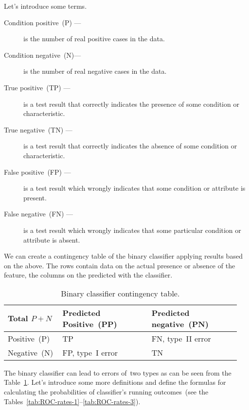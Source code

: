 \documentclass[]{scrreprt}
\begin{document}
Let's introduce some terms.
\begin{description}
	\item[Condition positive~(P) --- ] is the number of real positive cases in the data.
	\item[Condition negative~(N)---] is the number of real negative cases in the data.
	\item[True positive~(TP) ---] is a test result that correctly indicates the presence of some condition or characteristic.
	\item[True negative~(TN) ---] is a test result that correctly indicates the absence of some condition or characteristic.
	\item[False positive~(FP) ---] is a test result which wrongly indicates that some condition or attribute is present.
	\item[False negative~(FN) ---] is a test result which wrongly indicates that some particular condition or attribute is absent.
\end{description}
We can create a contingency table of the binary classifier applying results based on the above. The rows contain data on the actual presence or absence of the feature, the columns on the predicted with the classifier.
%
\begin{table}[htp]
	\caption{Binary classifier contingency table.}  \label{tab:ROC-contingency-table}
	\centering
	\begin{tabularx}{\textwidth}{p{0.2\linewidth} p{0.375\linewidth} p{0.375\linewidth}} 
		\hline
	Total $P+N$&Predicted Positive~(PP)&Predicted negative~(PN)\\
		\hline
		Positive~(P)&TP&FN, type~II error~\cite{Wiki:type-1-2-errors}\\
		\hline
		Negative~(N)&FP, type~I error~\cite{Wiki:type-1-2-errors}&TN\\
		\hline
	\end{tabularx}
\end{table}
%
The binary classifier can lead to errors of~two types as can be seen from the Table~\ref{tab:ROC-contingency-table}. Let's introduce some more definitions and define the formulas for calculating the probabilities of classifier's running outcomes~(see the Tables~\ref{tab:ROC-rates-1}--\ref{tab:ROC-rates-3}).
%
\end{document}
